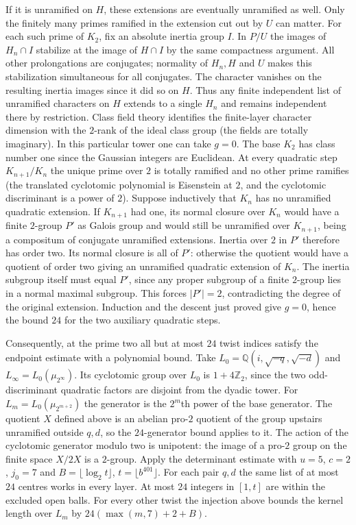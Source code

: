 \documentclass[11pt]{amsart}
\theoremstyle{definition}
\theoremstyle{remark}
\begin{document}
If it is unramified on $H$, these extensions are eventually
unramified as well. Only the finitely many primes ramified in the
extension cut out by $U$ can matter. For each such prime of $K_2$,
fix an absolute inertia group $I$. In $P/U$ the images of
$H_n\cap I$ stabilize at the image of $H\cap I$ by the same
compactness argument. All other prolongations are conjugates;
normality of $H_n,H$ and $U$ makes this stabilization simultaneous
for all conjugates. The character vanishes on the resulting inertia
images since it did so on $H$. Thus any finite independent list of
unramified characters on $H$ extends to a single $H_n$ and remains
independent there by restriction. Class field theory identifies the
finite-layer character dimension with the $2$-rank of the ideal
class group (the fields are totally imaginary). In this particular tower one can take $g=0$. The base $K_2$
has class number one since the Gaussian integers are Euclidean.
At every quadratic step $K_{n+1}/K_n$ the unique prime over $2$
is totally ramified and no other prime ramifies (the translated
cyclotomic polynomial is Eisenstein at $2$, and the cyclotomic
discriminant is a power of $2$). Suppose inductively that $K_n$
has no unramified quadratic extension. If $K_{n+1}$ had one,
its normal closure over $K_n$ would have a finite $2$-group $P'$
as Galois group and would still be unramified over $K_{n+1}$,
being a compositum of conjugate unramified extensions. Inertia
over $2$ in $P'$ therefore has order two. Its normal closure is
all of $P'$: otherwise the quotient would have a quotient of order
two giving an unramified quadratic extension of $K_n$. The inertia
subgroup itself must equal $P'$, since any proper subgroup of a
finite $2$-group lies in a normal maximal subgroup. This forces
$|P'|=2$, contradicting the degree of the original extension.
Induction and the descent just proved give $g=0$, hence the bound
$24$ for the two auxiliary quadratic steps.

Consequently, at the prime two all but at most $24$ twist indices
satisfy the endpoint estimate with a polynomial bound. Take
$L_0=\mathbb Q(i,\sqrt{-q},\sqrt{-d})$ and
$L_\infty=L_0(\mu_{2^\infty})$. Its cyclotomic group over $L_0$
is $1+4\mathbb Z_2$, since the two odd-discriminant quadratic
factors are disjoint from the dyadic tower. For
$L_m=L_0(\mu_{2^{m+2}})$ the generator is the $2^m$th power of
the base generator. The quotient $X$ defined above is an abelian
pro-$2$ quotient of the group upstairs unramified outside $q,d$,
so the $24$-generator bound applies to it. The action of the
cyclotomic generator modulo two is unipotent: the image of a
pro-$2$ group on the finite space $X/2X$ is a $2$-group.
Apply the determinant estimate with $u=5$, $c=2$, $j_0=7$ and
$B=\lfloor\log_2 t\rfloor$, $t=\lfloor b^{401}\rfloor$.
For each pair $q,d$ the same list of at most $24$ centres works
in every layer. At most $24$ integers in $[1,t]$ are within the
excluded open balls. For every other twist the injection above
bounds the kernel length over $L_m$ by
$24(\max(m,7)+2+B)$.
\end{document}

